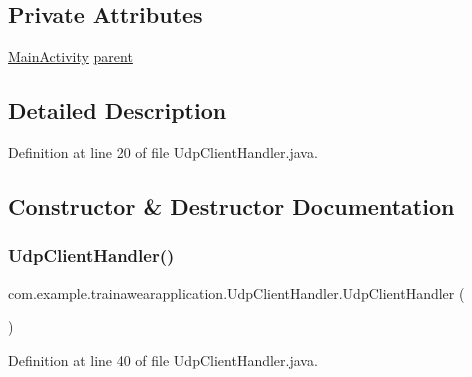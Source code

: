 \subsection*{Private Attributes}
\begin{DoxyCompactItemize}
\item 
\mbox{\hyperlink{classcom_1_1example_1_1trainawearapplication_1_1_main_activity}{Main\+Activity}} \mbox{\hyperlink{classcom_1_1example_1_1trainawearapplication_1_1_udp_client_handler_a93942bc64a7d7d570d27c9e485d361e4}{parent}}
\end{DoxyCompactItemize}


\subsection{Detailed Description}


Definition at line 20 of file Udp\+Client\+Handler.\+java.



\subsection{Constructor \& Destructor Documentation}
\mbox{\label{classcom_1_1example_1_1trainawearapplication_1_1_udp_client_handler_ab5ff425dbf594d074ab709f2be441419}} 
\subsubsection{\texorpdfstring{UdpClientHandler()}{UdpClientHandler()}}
{\footnotesize\ttfamily com.\+example.\+trainawearapplication.\+Udp\+Client\+Handler.\+Udp\+Client\+Handler (\begin{DoxyParamCaption}{ }\end{DoxyParamCaption})\hspace{0.3cm}{\ttfamily [inline]}}



Definition at line 40 of file Udp\+Client\+Handler.\+java.


\begin{DoxyCode}{0}

\end{DoxyCode}


